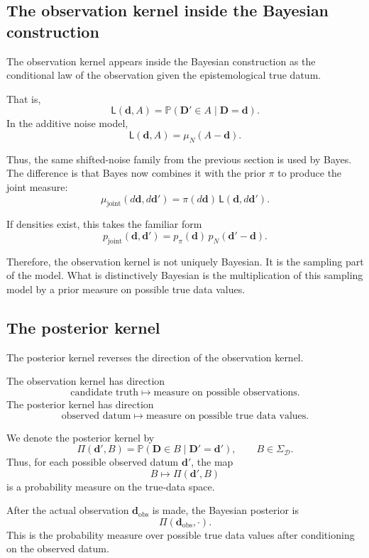 \documentclass[11pt]{article}
\newcommand{\SigmaD}{\Sigma_{\mathcal D}}
\newcommand{\muN}{\mu_N}
\newcommand{\prior}{\pi}
\newcommand{\Drand}{\mathbf D}
\newcommand{\Dobsrand}{\mathbf D'}
\newcommand{\dobs}{\mathbf d_{\mathrm{obs}}}
\newcommand{\Prob}{\mathbb P}
\begin{document}
\subsection{The observation kernel inside the Bayesian construction}

The observation kernel appears inside the Bayesian construction as the conditional law of the observation given the epistemological true datum.

That is,
\[
    \mathsf L(\mathbf d,A)
    =
    \Prob(\Dobsrand\in A\mid \Drand=\mathbf d).
\]
In the additive noise model,
\[
    \mathsf L(\mathbf d,A)
    =
    \muN(A-\mathbf d).
\]

Thus, the same shifted-noise family from the previous section is used by Bayes. The difference is that Bayes now combines it with the prior \(\prior\) to produce the joint measure:
\[
    \mu_{\mathrm{joint}}(d\mathbf d,d\mathbf d')
    =
    \prior(d\mathbf d)\,
    \mathsf L(\mathbf d,d\mathbf d').
\]

If densities exist, this takes the familiar form
\[
    p_{\mathrm{joint}}(\mathbf d,\mathbf d')
    =
    p_{\prior}(\mathbf d)\,
    p_N(\mathbf d'-\mathbf d).
\]

Therefore, the observation kernel is not uniquely Bayesian. It is the sampling part of the model. What is distinctively Bayesian is the multiplication of this sampling model by a prior measure on possible true data values.

\subsection{The posterior kernel}

The posterior kernel reverses the direction of the observation kernel.

The observation kernel has direction
\[
    \text{candidate truth}
    \longmapsto
    \text{measure on possible observations}.
\]
The posterior kernel has direction
\[
    \text{observed datum}
    \longmapsto
    \text{measure on possible true data values}.
\]

We denote the posterior kernel by
\[
    \Pi(\mathbf d',B)
    =
    \Prob(\Drand\in B\mid \Dobsrand=\mathbf d'),
    \qquad
    B\in\SigmaD.
\]
Thus, for each possible observed datum \(\mathbf d'\), the map
\[
    B\longmapsto \Pi(\mathbf d',B)
\]
is a probability measure on the true-data space.

After the actual observation \(\dobs\) is made, the Bayesian posterior is
\[
    \Pi(\dobs,\cdot).
\]
This is the probability measure over possible true data values after conditioning on the observed datum.
\end{document}
